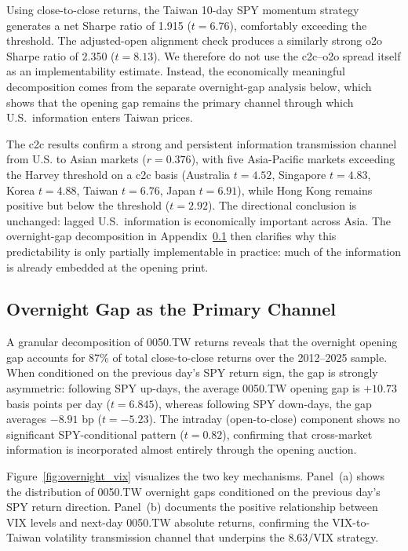 Using close-to-close returns, the Taiwan 10-day SPY momentum strategy generates a net Sharpe ratio of 1.915 ($t = 6.76$), comfortably exceeding the \citet{harvey2016} threshold. The adjusted-open alignment check produces a similarly strong o2o Sharpe ratio of 2.350 ($t = 8.13$). We therefore do not use the c2c--o2o spread itself as an implementability estimate. Instead, the economically meaningful decomposition comes from the separate overnight-gap analysis below, which shows that the opening gap remains the primary channel through which U.S.\ information enters Taiwan prices.

The c2c results confirm a strong and persistent information transmission channel from U.S. to Asian markets ($r = 0.376$), with five Asia-Pacific markets exceeding the Harvey threshold on a c2c basis (Australia $t = 4.52$, Singapore $t = 4.83$, Korea $t = 4.88$, Taiwan $t = 6.76$, Japan $t = 6.91$), while Hong Kong remains positive but below the threshold ($t = 2.92$). The directional conclusion is unchanged: lagged U.S.\ information is economically important across Asia. The overnight-gap decomposition in Appendix~\ref{app:overnight_gap} then clarifies why this predictability is only partially implementable in practice: much of the information is already embedded at the opening print.

\subsection{Overnight Gap as the Primary Channel}
\label{app:overnight_gap}

A granular decomposition of 0050.TW returns reveals that the overnight opening gap accounts for 87\% of total close-to-close returns over the 2012--2025 sample. When conditioned on the previous day's SPY return sign, the gap is strongly asymmetric: following SPY up-days, the average 0050.TW opening gap is $+10.73$ basis points per day ($t = 6.845$), whereas following SPY down-days, the gap averages $-8.91$ bp ($t = -5.23$). The intraday (open-to-close) component shows no significant SPY-conditional pattern ($t = 0.82$), confirming that cross-market information is incorporated almost entirely through the opening auction.

Figure~\ref{fig:overnight_vix} visualizes the two key mechanisms. Panel~(a) shows the distribution of 0050.TW overnight gaps conditioned on the previous day's SPY return direction. Panel~(b) documents the positive relationship between VIX levels and next-day 0050.TW absolute returns, confirming the VIX-to-Taiwan volatility transmission channel that underpins the $8.63/\text{VIX}$ strategy.

